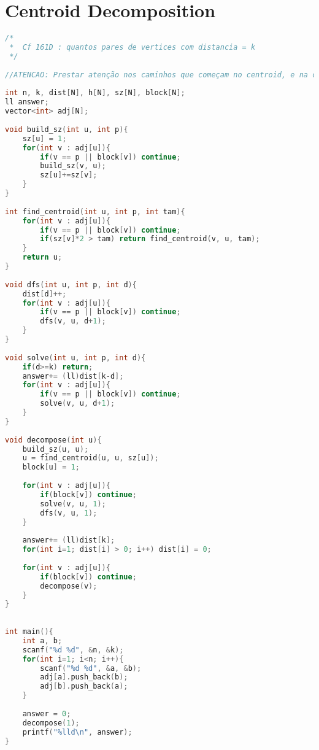 \documentclass[12pt,a4paper,twoside]{report}
\begin{document}
\section{Centroid Decomposition}
\noindent\begin{lstlisting}[caption=Centroid Decomposition,language=C++]
/*
 *  Cf 161D : quantos pares de vertices com distancia = k
 */
 
//ATENCAO: Prestar atenção nos caminhos que começam no centroid, e na contribuição de cada centroid na resposta final
 
int n, k, dist[N], h[N], sz[N], block[N];
ll answer;
vector<int> adj[N];
 
void build_sz(int u, int p){
    sz[u] = 1;
    for(int v : adj[u]){
        if(v == p || block[v]) continue;
        build_sz(v, u);
        sz[u]+=sz[v];
    }
}
 
int find_centroid(int u, int p, int tam){
    for(int v : adj[u]){
        if(v == p || block[v]) continue;
        if(sz[v]*2 > tam) return find_centroid(v, u, tam);
    }
    return u;
}
 
void dfs(int u, int p, int d){
    dist[d]++;
    for(int v : adj[u]){
        if(v == p || block[v]) continue;
        dfs(v, u, d+1);
    }
}
 
void solve(int u, int p, int d){
    if(d>=k) return;
    answer+= (ll)dist[k-d];
    for(int v : adj[u]){
        if(v == p || block[v]) continue;
        solve(v, u, d+1);
    }
}
 
void decompose(int u){  
    build_sz(u, u);
    u = find_centroid(u, u, sz[u]);
    block[u] = 1;
     
    for(int v : adj[u]){
        if(block[v]) continue;
        solve(v, u, 1);
        dfs(v, u, 1);
    }
     
    answer+= (ll)dist[k];
    for(int i=1; dist[i] > 0; i++) dist[i] = 0;
     
    for(int v : adj[u]){
        if(block[v]) continue;
        decompose(v);
    }
}
 
 
int main(){    
    int a, b;
    scanf("%d %d", &n, &k);
    for(int i=1; i<n; i++){
        scanf("%d %d", &a, &b);
        adj[a].push_back(b);
        adj[b].push_back(a);
    }
     
    answer = 0;
    decompose(1);
    printf("%lld\n", answer);
}
\end{lstlisting}
\end{document}
